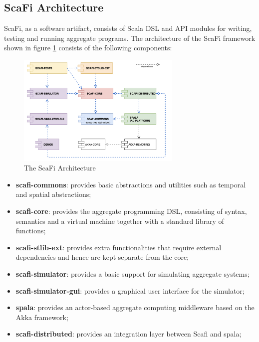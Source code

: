 \subsection*{ScaFi Architecture}
ScaFi, as a software artifact, consists of Scala DSL and API modules for writing, testing and running aggregate programs. The architecture of the ScaFi framework shown in figure \ref{fig:scafi-architecture} consists of the following components:

\begin{figure}[h]
    \centering
    \includegraphics[width=0.7\textwidth]{figures/scafi-architecture.png}
    \caption{The ScaFi Architecture}
    \label{fig:scafi-architecture}
\end{figure}

\begin{itemize}
    \item \textbf{scafi-commons}: provides basic abstractions and utilities such as temporal and spatial abstractions;
    \item \textbf{scafi-core}: provides the aggregate programming DSL, consisting of syntax, semantics and a virtual machine together with a standard library of functions;
    \item \textbf{scafi-stlib-ext}: provides extra functionalities that require external dependencies and hence are kept separate from the core;
    \item \textbf{scafi-simulator}: provides a basic support for simulating aggregate systems;
    \item \textbf{scafi-simulator-gui}: provides a graphical user interface for the simulator;
    \item \textbf{spala}: provides an actor-based aggregate computing middleware based on the Akka framework;
    \item \textbf{scafi-distributed}: provides an integration layer between Scafi and spala;
\end{itemize}

